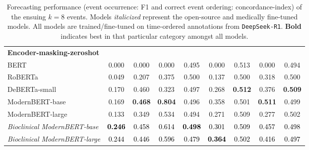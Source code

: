 \begin{table}[!htbp]
{\begin{tabular}{lcccccccc}
\midrule
\textbf{Encoder-masking-zeroshot} &&&&&&&&\\
BERT & 0.000 & 0.000 & 0.000 & 0.495 & 0.000 & 0.513 & 0.000 & 0.494 \\
RoBERTa & 0.049 & 0.207 & 0.375 & 0.500 & 0.137 & 0.500 & 0.318 & 0.500 \\
DeBERTa-small & 0.170 & 0.460 & 0.323 & 0.497 & 0.268 & \textbf{0.512} & 0.376 & \textbf{0.509} \\
ModernBERT-base & 0.169 & \textbf{0.468} & \textbf{0.804} & 0.496 & 0.358 & 0.501 & \textbf{0.511} & 0.499 \\
ModernBERT-large & 0.133 & 0.349 & 0.534 & 0.494 & 0.271 & 0.509 & 0.277 & 0.502 \\
\textit{Bioclinical ModernBERT-base} & \textcolor{black}{\textbf{0.246}} & \textcolor{black}{0.458} & \textcolor{black}{0.614} & \textcolor{black}{\textbf{0.498}} & \textcolor{black}{0.301} & \textcolor{black}{0.509} & \textcolor{black}{0.457} & \textcolor{black}{0.498} \\
\textit{Bioclinical ModernBERT-large} & \textcolor{black}{0.244} & \textcolor{black}{0.446} & \textcolor{black}{0.596} & \textcolor{black}{0.479} & \textcolor{black}{\textbf{0.364}} & \textcolor{black}{0.502} & \textcolor{black}{0.416} & \textcolor{black}{0.497} \\
\bottomrule
\end{tabular}
}
\caption{Forecasting performance (event occurrence: F1 and correct event ordering: concordance-index) of the ensuing $k=8$ events.  Models \emph{italicized} represent the open-source and medically fine-tuned models. All models are trained/fine-tuned on time-ordered annotations from \texttt{DeepSeek-R1}. \textbf{Bold} indicates best in that particular category amongst all models.}
\label{tab:DS_forecasting}
\end{table}
